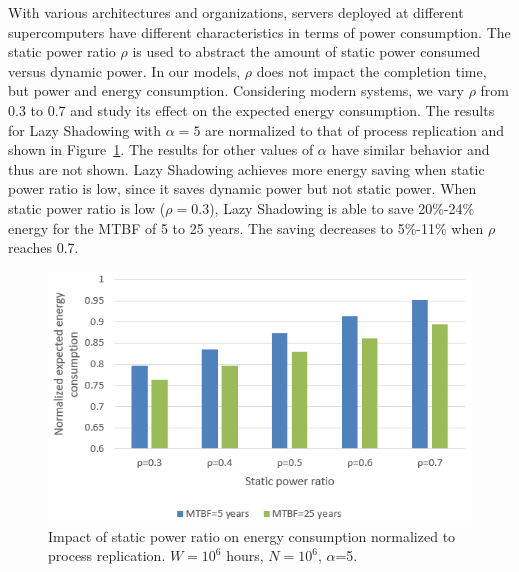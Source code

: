 With various architectures and organizations, servers deployed at
different supercomputers have different characteristics in terms of
power consumption. The static power ratio $\rho$ is used to abstract the
amount of static power consumed versus dynamic power. In our models,
$\rho$ does not impact the completion time, but power and energy consumption.
Considering modern systems, we vary $\rho$ from 0.3 to 0.7 and study its effect
on the expected energy consumption. The results for Lazy Shadowing with $\alpha=5$ are normalized to that of process replication and shown in 
Figure~\ref{fig:power_ratio}. The results for other values of $\alpha$ have similar behavior and thus are not shown. Lazy Shadowing achieves
more energy saving when static power ratio is low, since it saves dynamic 
power but not static power. When static power ratio is low ($\rho=0.3$), Lazy Shadowing
is able to save 20\%-24\% energy for the MTBF of 5 to 25 years. The saving decreases to 5\%-11\% when $\rho$ reaches 0.7. 

\begin{figure}[!t]
	\begin{center}
		\includegraphics[width=\columnwidth]{Figures/s_power_5}
	\end{center}
	\caption{Impact of static power ratio on energy consumption normalized to process replication. $W=10^6$ hours, $N=10^6$, $\alpha$=5.}
	\label{fig:power_ratio}
\end{figure}